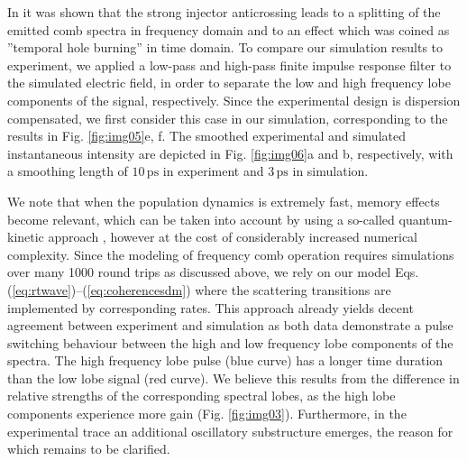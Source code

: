 \documentclass[10pt,letterpaper]{article}%
\begin{document}
\label{sec:timedomain}

In \cite{burghoff2015evaluating} it was shown that the strong injector
anticrossing leads to a splitting of the emitted comb spectra in frequency
domain and to an effect which was coined as ''temporal hole burning'' in time
domain. To compare our simulation results to experiment, we applied a low-pass
and high-pass finite impulse response filter to the simulated electric field,
in order to separate the low and high frequency lobe components of the signal,
respectively. Since the experimental design is dispersion compensated, we
first consider this case in our simulation, corresponding to the results in
Fig. \ref{fig:img05}e, f. The smoothed experimental and simulated
instantaneous intensity are depicted in Fig. \ref{fig:img06}a and b,
respectively, with a smoothing length of\textrm{ }$10{\,}\mathrm{ps}$ in experiment
 and $3{\,}\mathrm{ps}$ in simulation.

We note that when the population dynamics is extremely fast,
memory effects become relevant, which can be taken into account by using a
so-called quantum-kinetic approach \cite{butscher2005ultrafast}, however at the cost of
considerably increased numerical complexity. Since the modeling of frequency comb
operation requires simulations over many 1000 round trips as discussed above,
we rely on our model Eqs. (\ref{eq:rtwave})--(\ref{eq:coherencesdm})
where the scattering transitions are implemented by corresponding rates.
This approach already yields decent agreement between experiment and simulation as both data
demonstrate a pulse switching behaviour between the high and low frequency
lobe components of the spectra. The high frequency lobe pulse (blue curve) has
a longer time duration than the low lobe signal (red curve). We believe this
results from the difference in relative strengths of the corresponding
spectral lobes, as the high lobe components experience more gain (Fig.
\ref{fig:img03}). Furthermore, in the experimental trace an additional
oscillatory substructure emerges, the reason for which remains to be clarified.
\end{document}
